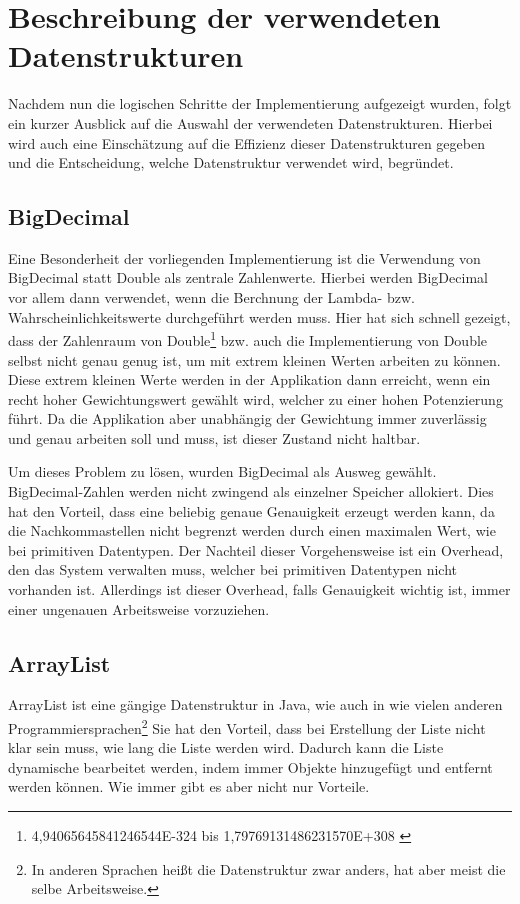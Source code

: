 \section{Beschreibung der verwendeten Datenstrukturen}
Nachdem nun die logischen Schritte der Implementierung aufgezeigt wurden, folgt ein kurzer Ausblick auf die Auswahl der verwendeten Datenstrukturen. Hierbei wird auch eine Einschätzung auf die Effizienz dieser Datenstrukturen gegeben und die Entscheidung, welche Datenstruktur verwendet wird, begründet.

\subsection{BigDecimal}
Eine Besonderheit der vorliegenden Implementierung ist die Verwendung von BigDecimal statt Double als zentrale Zahlenwerte. Hierbei werden BigDecimal vor allem dann verwendet, wenn die Berchnung der Lambda- bzw. Wahrscheinlichkeitswerte durchgeführt werden muss. Hier hat sich schnell gezeigt, dass der Zahlenraum von Double\footnote{4,94065645841246544E-324 bis 1,79769131486231570E+308 \cite{Ullenboom2011}} bzw. auch die Implementierung von Double selbst nicht genau genug ist, um mit extrem kleinen Werten arbeiten zu können. Diese extrem kleinen Werte werden in der Applikation dann erreicht, wenn ein recht hoher Gewichtungswert gewählt wird, welcher zu einer hohen Potenzierung führt. Da die Applikation aber unabhängig der Gewichtung immer zuverlässig und genau arbeiten soll und muss, ist dieser Zustand nicht haltbar.

Um dieses Problem zu lösen, wurden BigDecimal als Ausweg gewählt. BigDecimal-Zahlen werden nicht zwingend als einzelner Speicher allokiert. Dies hat den Vorteil, dass eine beliebig genaue Genauigkeit erzeugt werden kann, da die Nachkommastellen nicht begrenzt werden durch einen maximalen Wert, wie bei primitiven Datentypen. Der Nachteil dieser Vorgehensweise ist ein Overhead, den das System verwalten muss, welcher bei primitiven Datentypen nicht vorhanden ist. Allerdings ist dieser Overhead, falls Genauigkeit wichtig ist, immer einer ungenauen Arbeitsweise vorzuziehen.

\subsection{ArrayList}
ArrayList ist eine gängige Datenstruktur in Java, wie auch in wie vielen anderen Programmiersprachen\footnote{In anderen Sprachen heißt die Datenstruktur zwar anders, hat aber meist die selbe Arbeitsweise.} Sie hat den Vorteil, dass bei Erstellung der Liste nicht klar sein muss, wie lang die Liste werden wird. Dadurch kann die Liste dynamische bearbeitet werden, indem immer Objekte hinzugefügt und entfernt werden können. Wie immer gibt es aber nicht nur Vorteile. 

